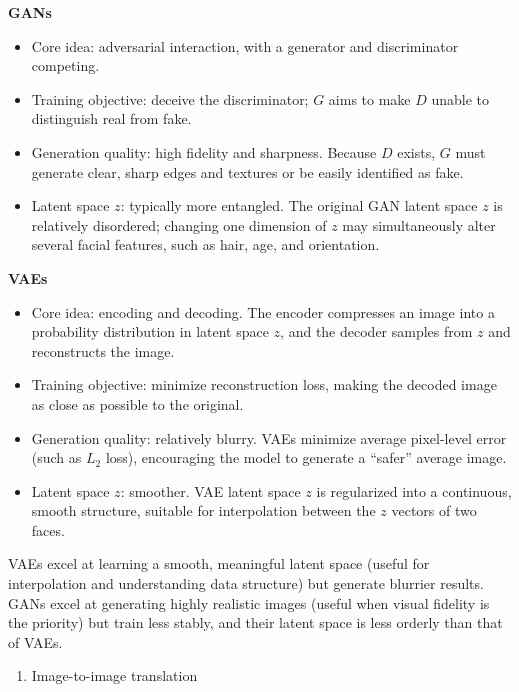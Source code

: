 \textbf{GANs}

\begin{itemize}
\tightlist
\item
  Core idea: adversarial interaction, with a generator and discriminator competing.
\item
  Training objective: deceive the discriminator; \(G\) aims to make \(D\) unable to distinguish real from fake.
\item
  Generation quality: high fidelity and sharpness. Because \(D\) exists, \(G\) must generate clear, sharp edges and textures or be easily identified as fake.
\item
  Latent space \(z\): typically more entangled. The original GAN latent space \(z\) is relatively disordered; changing one dimension of \(z\) may simultaneously alter several facial features, such as hair, age, and orientation.
\end{itemize}

\textbf{VAEs}

\begin{itemize}
\tightlist
\item
  Core idea: encoding and decoding. The encoder compresses an image into a probability distribution in latent space \(z\), and the decoder samples from \(z\) and reconstructs the image.
\item
  Training objective: minimize reconstruction loss, making the decoded image as close as possible to the original.
\item
  Generation quality: relatively blurry. VAEs minimize average pixel-level error (such as \(L_2\) loss), encouraging the model to generate a ``safer'' average image.
\item
  Latent space \(z\): smoother. VAE latent space \(z\) is regularized into a continuous, smooth structure, suitable for interpolation between the \(z\) vectors of two faces.
\end{itemize}

VAEs excel at learning a smooth, meaningful latent space (useful for interpolation and understanding data structure) but generate blurrier results. GANs excel at generating highly realistic images (useful when visual fidelity is the priority) but train less stably, and their latent space is less orderly than that of VAEs.

\begin{enumerate}
\def\labelenumi{\arabic{enumi}.}
\setcounter{enumi}{1}
\tightlist
\item
  Image-to-image translation
\end{enumerate}


